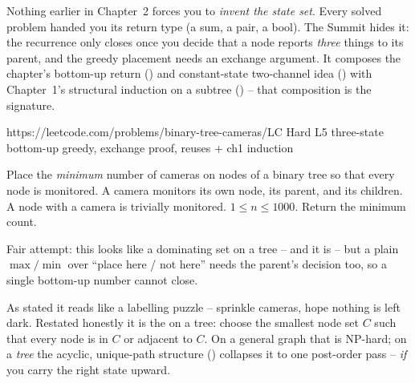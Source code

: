 
\begin{notebox}
Nothing earlier in Chapter~2 forces you to \emph{invent the state set}. Every solved
problem handed you its return type (a sum, a pair, a bool). The Summit hides it: the
recurrence only closes once you decide that a node reports \emph{three} things to its
parent, and the greedy placement needs an exchange argument. It composes the chapter's
bottom-up return () and constant-state two-channel idea
() with Chapter~1's structural induction on a subtree
() -- that composition is the  signature.
\end{notebox}

  {https://leetcode.com/problems/binary-tree-cameras/}{LC Hard L5}
  {three-state bottom-up greedy, exchange proof, reuses  + ch1 induction}

\begin{problemstatement}
Place the \emph{minimum} number of cameras on nodes of a binary tree so that every
node is monitored. A camera monitors its own node, its parent, and its children.
A node with a camera is trivially monitored. $1 \le n \le 1000$. Return the minimum
count.
\end{problemstatement}

\begin{attemptgate}
Fair attempt: this looks like a dominating set on a tree -- and it is -- but a plain
$\max/\min$ over ``place here / not here'' needs the parent's decision too, so a
single bottom-up number cannot close.
\end{attemptgate}

As stated it reads like a labelling puzzle -- sprinkle cameras, hope nothing is left
dark. Restated honestly it is the  on a tree: choose the
smallest node set $C$ such that every node is in $C$ or adjacent to $C$. On a general
graph that is NP-hard; on a \emph{tree} the acyclic, unique-path structure ()
collapses it to one post-order pass -- \emph{if} you carry the right state upward.

